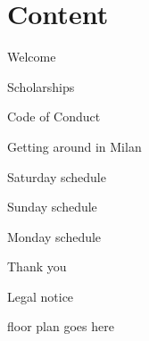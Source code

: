 \section*{Content}

\vspace*{0.35em}%
\noindent Welcome\dotfill \pageref{welcome}

\vspace*{0.35em}%
\noindent Scholarships \dotfill \pageref{scholarships}

\vspace*{0.35em}%
\noindent Code of Conduct \dotfill \pageref{coc}

\vspace*{0.35em}%
\noindent Getting around in Milan\dotfill \pageref{getting-around}

\vspace*{0.35em}%
\noindent Saturday schedule\dotfill \pageref{saturday}

\vspace*{0.35em}%
\noindent Sunday schedule \dotfill \pageref{sunday}

\vspace*{0.35em}%
\noindent Monday schedule \dotfill \pageref{monday}

\vspace*{0.35em}%
\noindent Thank you \dotfill \pageref{thanks}

\vspace*{0.35em}%
\noindent Legal notice \dotfill \pageref{legal}

\vfill
floor plan goes here

\newpage
